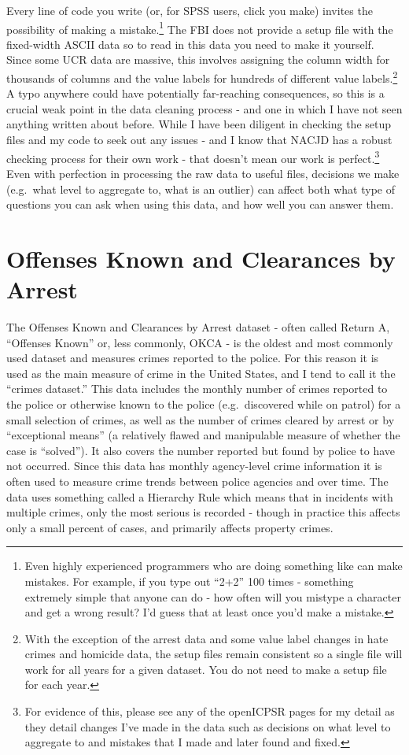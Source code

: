\documentclass[
  12pt,
  openany]{book}
\begin{document}
Every line of code you write (or, for SPSS users, click you make) invites the possibility of making a mistake.\footnote{Even highly experienced programmers who are doing something like can make mistakes. For example, if you type out ``2+2'' 100 times - something extremely simple that anyone can do - how often will you mistype a character and get a wrong result? I'd guess that at least once you'd make a mistake.} The FBI does not provide a setup file with the fixed-width ASCII data so to read in this data you need to make it yourself. Since some UCR data are massive, this involves assigning the column width for thousands of columns and the value labels for hundreds of different value labels.\footnote{With the exception of the arrest data and some value label changes in hate crimes and homicide data, the setup files remain consistent so a single file will work for all years for a given dataset. You do not need to make a setup file for each year.} A typo anywhere could have potentially far-reaching consequences, so this is a crucial weak point in the data cleaning process - and one in which I have not seen anything written about before. While I have been diligent in checking the setup files and my code to seek out any issues - and I know that NACJD has a robust checking process for their own work - that doesn't mean our work is perfect.\footnote{For evidence of this, please see any of the openICPSR pages for my detail as they detail changes I've made in the data such as decisions on what level to aggregate to and mistakes that I made and later found and fixed.} Even with perfection in processing the raw data to useful files, decisions we make (e.g.~what level to aggregate to, what is an outlier) can affect both what type of questions you can ask when using this data, and how well you can answer them.

\hypertarget{offensesKnown}{%
\chapter{Offenses Known and Clearances by Arrest}\label{offensesKnown}}

The Offenses Known and Clearances by Arrest dataset - often called Return A, ``Offenses Known'' or, less commonly, OKCA - is the oldest and most commonly used dataset and measures crimes reported to the police. For this reason it is used as the main measure of crime in the United States, and I tend to call it the ``crimes dataset.'' This data includes the monthly number of crimes reported to the police or otherwise known to the police (e.g.~discovered while on patrol) for a small selection of crimes, as well as the number of crimes cleared by arrest or by ``exceptional means'' (a relatively flawed and manipulable measure of whether the case is ``solved''). It also covers the number reported but found by police to have not occurred. Since this data has monthly agency-level crime information it is often used to measure crime trends between police agencies and over time. The data uses something called a Hierarchy Rule which means that in incidents with multiple crimes, only the most serious is recorded - though in practice this affects only a small percent of cases, and primarily affects property crimes.
\end{document}
